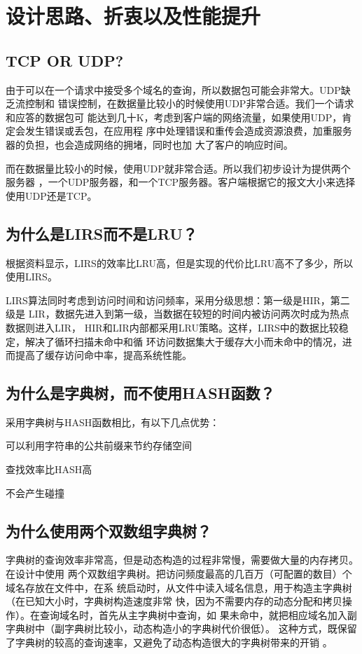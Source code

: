 %
%
\section{设计思路、折衷以及性能提升} 
\subsection{TCP OR UDP?}
由于可以在一个请求中接受多个域名的查询，所以数据包可能会非常大。UDP缺乏流控制和
错误控制，在数据量比较小的时候使用UDP非常合适。我们一个请求和应答的数据包可
能达到几十K，考虑到客户端的网络流量，如果使用UDP，肯定会发生错误或丢包，在应用程
序中处理错误和重传会造成资源浪费，加重服务器的负担，也会造成网络的拥堵，同时也加
大了客户的响应时间。
\par{而在数据量比较小的时候，使用UDP就非常合适。所以我们初步设计为提供两个服务器
，一个UDP服务器，和一个TCP服务器。客户端根据它的报文大小来选择使用UDP还是TCP。}
\subsection{为什么是LIRS而不是LRU？}
根据资料显示，LIRS的效率比LRU高，但是实现的代价比LRU高不了多少，所以使用LIRS。
\par{LIRS算法同时考虑到访问时间和访问频率，采用分级思想：第一级是HIR，第二级是
LIR，数据先进入到第一级，当数据在较短的时间内被访问两次时成为热点数据则进入LIR，
HIR和LIR内部都采用LRU策略。这样，LIRS中的数据比较稳定，解决了循环扫描未命中和循
环访问数据集大于缓存大小而未命中的情况，进而提高了缓存访问命中率，提高系统性能。
}
\subsection{为什么是字典树，而不使用HASH函数？} 
采用字典树与HASH函数相比，有以下几点优势：
\begin{asparaenum}[1.]
\item{可以利用字符串的公共前缀来节约存储空间} 
\item{查找效率比HASH高\cite{DATA}}
\item{不会产生碰撞} 
\end{asparaenum}

\subsection{为什么使用两个双数组字典树？}
字典树的查询效率非常高，但是动态构造的过程非常慢，需要做大量的内存拷贝。在设计中使用
两个双数组字典树。把访问频度最高的几百万（可配置的数目）个域名存放在文件中，在系
统启动时，从文件中读入域名信息，用于构造主字典树（在已知大小时，字典树构造速度非常
快，因为不需要内存的动态分配和拷贝操作）。在查询域名时，首先从主字典树中查询，如
果未命中，就把相应域名加入副字典树中（副字典树比较小，动态构造小的字典树代价很低）。
这种方式，既保留了字典树的较高的查询速率，又避免了动态构造很大的字典树带来的开销
。

